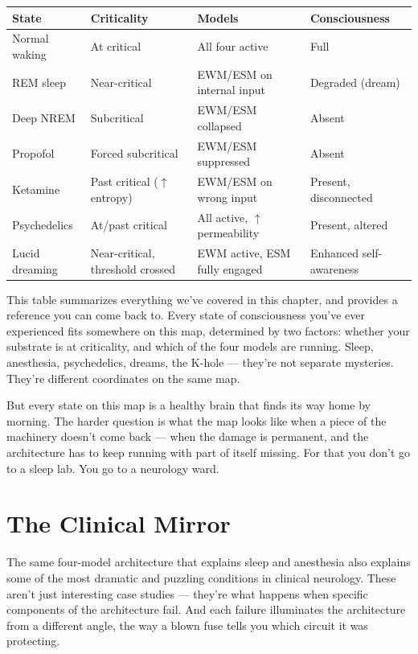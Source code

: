 \documentclass[11pt, twoside, openright]{book}
\begin{document}
\small
\begin{xltabular}{\linewidth}{X X X X}
\toprule
\textbf{State} & \textbf{Criticality} & \textbf{Models} & \textbf{Consciousness} \\
\midrule\endhead
Normal waking & At critical & All four active & Full \\[4pt]
REM sleep & Near-critical & EWM/\allowbreak{}ESM on internal input & Degraded (dream) \\[4pt]
Deep NREM & Subcritical & EWM/\allowbreak{}ESM collapsed & Absent \\[4pt]
Propofol & Forced subcritical & EWM/\allowbreak{}ESM suppressed & Absent \\[4pt]
Ketamine & Past critical ($\uparrow$ entropy) & EWM/\allowbreak{}ESM on wrong input & Present, disconnected \\[4pt]
Psychedelics & At/\allowbreak{}past critical & All active, $\uparrow$ permeability & Present, altered \\[4pt]
Lucid dreaming & Near-critical, threshold crossed & EWM active, ESM fully engaged & Enhanced self-awareness \\[4pt]
\bottomrule
\end{xltabular}
\normalsize


This table summarizes everything we've covered in this chapter, and provides a reference you can come back to. Every state of consciousness you've ever experienced fits somewhere on this map, determined by two factors: whether your substrate is at criticality, and which of the four models are running. Sleep, anesthesia, psychedelics, dreams, the K-hole --- they're not separate mysteries. They're different coordinates on the same map.

But every state on this map is a healthy brain that finds its way home by morning. The harder question is what the map looks like when a piece of the machinery doesn't come back --- when the damage is permanent, and the architecture has to keep running with part of itself missing. For that you don't go to a sleep lab. You go to a neurology ward.


\chapter{The Clinical Mirror}

The same four-model architecture that explains sleep and anesthesia also explains some of the most dramatic and puzzling conditions in clinical neurology. These aren't just interesting case studies --- they're what happens when specific components of the architecture fail. And each failure illuminates the architecture from a different angle, the way a blown fuse tells you which circuit it was protecting.
\end{document}
